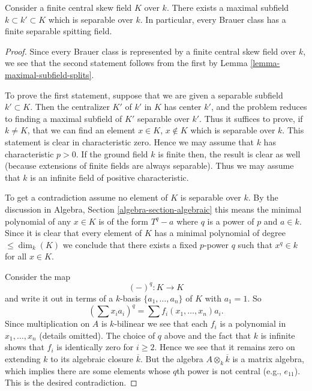 \begin{proposition}
\label{proposition-separable-splitting-field}
Consider a finite central skew field $K$ over $k$.
There exists a maximal subfield $k \subset k' \subset K$ which
is separable over $k$.
In particular, every Brauer class has a finite separable
spitting field.
\end{proposition}

\begin{proof}
Since every Brauer class is represented by a finite central skew
field over $k$, we see that the second statement follows from the
first by
Lemma \ref{lemma-maximal-subfield-splits}.

\medskip\noindent
To prove the first statement, suppose that we are given a separable
subfield $k' \subset K$. Then the centralizer $K'$ of $k'$ in $K$
has center $k'$, and the problem reduces to finding a maximal
subfield of $K'$ separable over $k'$. Thus it suffices to prove, if
$k \not = K$, that we can find an element $x \in K$, $x \not \in K$
which is separable over $k$. This statement is clear in characteristic
zero. Hence we may assume that $k$ has characteristic $p > 0$. If the
ground field $k$ is finite then, the result is clear as well (because
extensions of finite fields are always separable). Thus we may assume
that $k$ is an infinite field of positive characteristic.

\medskip\noindent
To get a contradiction assume no element of $K$ is separable over $k$.
By the discussion in
Algebra, Section \ref{algebra-section-algebraic}
this means the minimal polynomial of any $x \in K$ is of the form
$T^q - a$ where $q$ is a power of $p$ and $a \in k$. Since it is
clear that every element of $K$ has a minimal polynomial of degree
$\leq \dim_k(K)$ we conclude that there exists a fixed $p$-power
$q$ such that $x^q \in k$ for all $x \in K$.

\medskip\noindent
Consider the map
$$
(-)^q : K \longrightarrow K
$$
and write it out in terms of a $k$-basis $\{a_1, \ldots, a_n\}$ of $K$
with $a_1 = 1$. So
$$
(\sum x_i a_i)^q = \sum f_i(x_1, \ldots, x_n)a_i.
$$
Since multiplication on $A$ is $k$-bilinear we see that each $f_i$
is a polynomial in $x_1, \ldots, x_n$ (details omitted).
The choice of $q$ above and the fact that $k$ is infinite shows that
$f_i$ is identically zero for $i \geq 2$. Hence we see that it remains
zero on extending $k$ to its algebraic closure $\overline{k}$. But the
algebra $A \otimes_k \overline{k}$ is a matrix algebra, which implies
there are some elements whose $q$th power is not central (e.g., $e_{11}$).
This is the desired contradiction.
\end{proof}
















